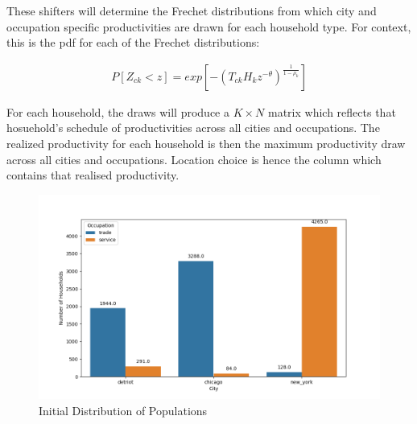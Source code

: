\documentclass[10pt]{article}
\begin{document}
\vspace{2em}

These shifters will determine the Frechet distributions from which city and occupation specific productivities are drawn for each household type. For context, this is the pdf for each of the Frechet distributions:

\begin{align}
    P[Z_{ck} < z] = exp[-(T_{ck} H_k z^{-\theta})^{\frac{1}{1 - \rho_k}}]
\end{align}

For each household, the draws will produce a $K \times N$ matrix which reflects that hosuehold's schedule of productivities across all cities and occupations. The realized productivity for each household is then the maximum productivity draw across all cities and occupations. Location choice is hence the column which contains that realised productivity.


\begin{figure}
    \centering
    \includegraphics[width=\textwidth]{../simulations/graphs/city_pop.png}
    \caption{Initial Distribution of Populations}
    \label{city_pop}
\end{figure}
\end{document}
